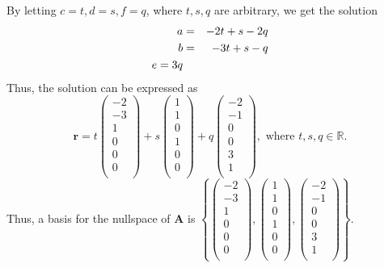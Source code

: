 \documentclass{article}
\newcommand{\bs}[1]{\boldsymbol{#1}}
\begin{document}
\begin{enumerate}[(i)]
By letting $c=t,d=s,f=q$, where $t,s,q$ are arbitrary, we get the solution 
\begin{eqnarray}
    a &=& -2t + s -2q \notag\\
    b &=& -3t + s - q \notag\\
    e = 3q \notag
\end{eqnarray}
Thus, the solution can be expressed as
$$\bs{r} = t\left(\begin{array}{c}
    -2 \\
    -3 \\
    1 \\
    0 \\
    0 \\
    0 \\
    \end{array}\right)+ s \left(\begin{array}{c}
    1 \\
    1 \\
    0 \\
    1 \\
    0 \\
    0 \\
    \end{array}\right)+q\left(\begin{array}{c}
    -2 \\
    -1 \\
    0 \\
    0 \\
    3 \\
    1 \\
    \end{array}\right),\text{ where } t,s,q\in\mathbb{R}.$$
    Thus, a basis for the nullspace of $\bs{A}$ is 
    $\left\{\left(\begin{array}{c}
    -2 \\
    -3 \\
    1 \\
    0 \\
    0 \\
    0 \\
    \end{array}\right), \left(\begin{array}{c}
    1 \\
    1 \\
    0 \\
    1 \\
    0 \\
    0 \\
    \end{array}\right),\left(\begin{array}{c}
    -2 \\
    -1 \\
    0 \\
    0 \\
    3 \\
    1 \\
    \end{array}\right)\right\}.$


\end{enumerate}
\end{document}
